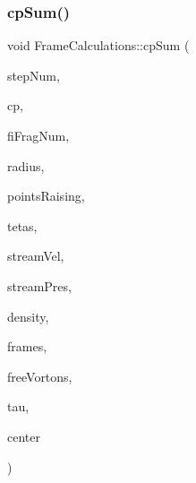 \subsubsection{\texorpdfstring{cp\+Sum()}{cpSum()}}
{\footnotesize\ttfamily void Frame\+Calculations\+::cp\+Sum (\begin{DoxyParamCaption}\item[{const int}]{step\+Num,  }\item[{Q\+Vector$<$ double $>$ \&}]{cp,  }\item[{const int}]{fi\+Frag\+Num,  }\item[{const double}]{radius,  }\item[{const double}]{points\+Raising,  }\item[{const Q\+Vector$<$ double $>$ \&}]{tetas,  }\item[{const \mbox{\hyperlink{class_vector3_d}{Vector3D}}}]{stream\+Vel,  }\item[{const double}]{stream\+Pres,  }\item[{const double}]{density,  }\item[{const Q\+Vector$<$ std\+::shared\+\_\+ptr$<$ \mbox{\hyperlink{class_multi_frame}{Multi\+Frame}} $>$$>$}]{frames,  }\item[{Q\+Vector$<$ \mbox{\hyperlink{class_vorton}{Vorton}} $>$}]{free\+Vortons,  }\item[{double}]{tau,  }\item[{const \mbox{\hyperlink{class_vector3_d}{Vector3D}}}]{center }\end{DoxyParamCaption})}

